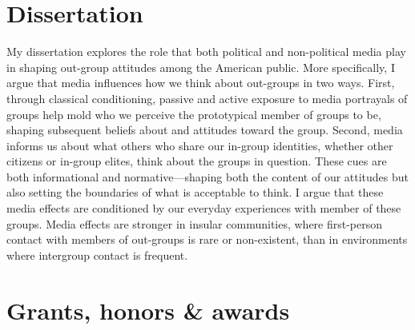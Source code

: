 \documentclass[11pt, a4paper]{article}
\begin{document}
\section*{Dissertation}

My dissertation explores the role that both political and non-political media play in shaping out-group attitudes among the American public. More specifically, I argue that media influences how we think about out-groups in two ways. First, through classical conditioning, passive and active exposure to media portrayals of groups help mold who we perceive the prototypical member of groups to be, shaping subsequent beliefs about and attitudes toward the group. Second, media informs us about what others who share our in-group identities, whether other citizens or in-group elites, think about the groups in question. These cues are both informational and normative---shaping both the content of our attitudes but also setting the boundaries of what is acceptable to think. I argue that these media effects are conditioned by our everyday experiences with member of these groups. Media effects are stronger in insular communities, where first-person contact with members of out-groups is rare or non-existent, than in environments where intergroup contact is frequent.

\section*{Grants, honors \& awards}
\end{document}
